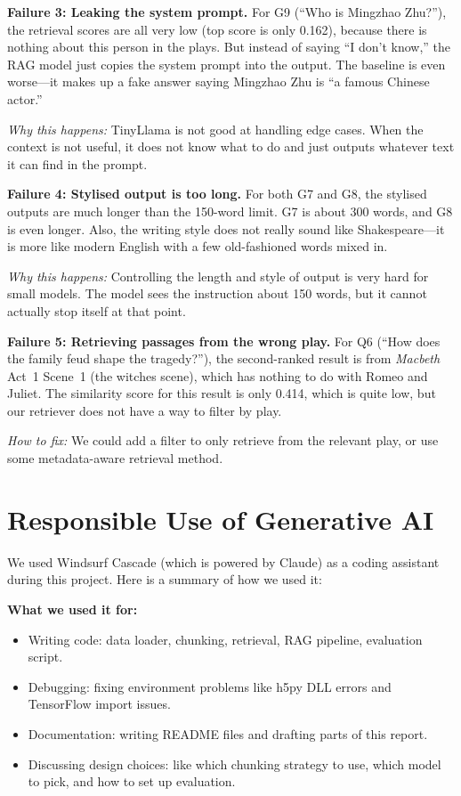 \documentclass[10pt,conference]{IEEEtran}
\begin{document}
\textbf{Failure 3: Leaking the system prompt.}
For G9 (``Who is Mingzhao Zhu?''), the retrieval scores are all very low (top score is only 0.162), because there is nothing about this person in the plays. But instead of saying ``I don't know,'' the RAG model just copies the system prompt into the output. The baseline is even worse---it makes up a fake answer saying Mingzhao Zhu is ``a famous Chinese actor.''

\textit{Why this happens:} TinyLlama is not good at handling edge cases. When the context is not useful, it does not know what to do and just outputs whatever text it can find in the prompt.

\textbf{Failure 4: Stylised output is too long.}
For both G7 and G8, the stylised outputs are much longer than the 150-word limit. G7 is about 300 words, and G8 is even longer. Also, the writing style does not really sound like Shakespeare---it is more like modern English with a few old-fashioned words mixed in.

\textit{Why this happens:} Controlling the length and style of output is very hard for small models. The model sees the instruction about 150 words, but it cannot actually stop itself at that point.

\textbf{Failure 5: Retrieving passages from the wrong play.}
For Q6 (``How does the family feud shape the tragedy?''), the second-ranked result is from \textit{Macbeth} Act~1 Scene~1 (the witches scene), which has nothing to do with Romeo and Juliet. The similarity score for this result is only 0.414, which is quite low, but our retriever does not have a way to filter by play.

\textit{How to fix:} We could add a filter to only retrieve from the relevant play, or use some metadata-aware retrieval method.

\section{Responsible Use of Generative AI}
\label{sec:genai}

We used Windsurf Cascade (which is powered by Claude) as a coding assistant during this project. Here is a summary of how we used it:

\textbf{What we used it for:}
\begin{itemize}
    \item Writing code: data loader, chunking, retrieval, RAG pipeline, evaluation script.
    \item Debugging: fixing environment problems like h5py DLL errors and TensorFlow import issues.
    \item Documentation: writing README files and drafting parts of this report.
    \item Discussing design choices: like which chunking strategy to use, which model to pick, and how to set up evaluation.
\end{itemize}
\end{document}
